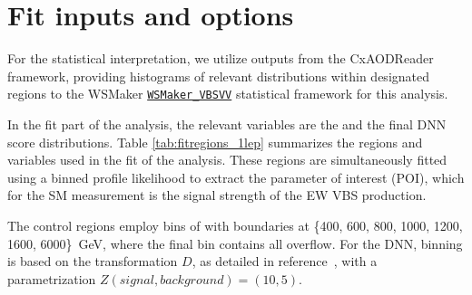 \clearpage
\section{Fit inputs and options}
\label{subsec:fit_options}

For the statistical interpretation, we utilize outputs from the CxAODReader framework, providing histograms of relevant distributions within designated regions to the WSMaker 
\mbox{\texttt{\href{https://gitlab.cern.ch/atlas-physics/sm/ew/vbs-semileptonic-run2/WSMaker\_VBSVV}{WSMaker\_VBSVV}}}
statistical framework for this analysis.

In the fit part of the analysis, the relevant variables are the \mjjtag and the final DNN score distributions.
Table \ref{tab:fitregions_1lep} summarizes the regions and variables used in the fit of the analysis.
These regions are simultaneously fitted using a binned profile likelihood to extract the parameter of interest (POI), which for the SM measurement is the signal strength of the EW VBS production.

The control regions employ bins of \mjjtag with boundaries at \{400, 600, 800, 1000, 1200, 1600, 6000\}~GeV, where the final bin contains all overflow. For the DNN, binning is based on the transformation \(D\), as detailed in reference~\cite{Buscher:2232472}, with a parametrization $Z(signal, background) = (10,5)$.




